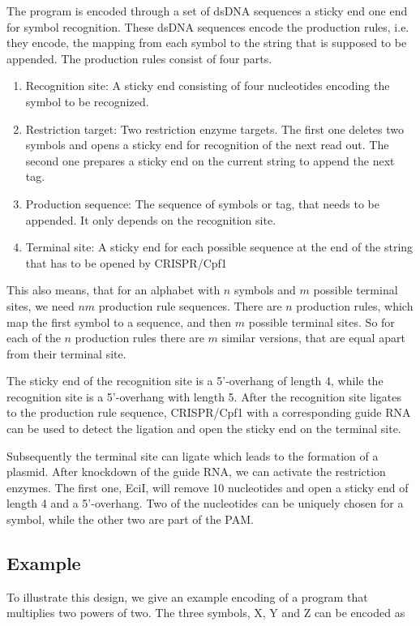 \documentclass[
11pt, %
a4paper, %
oneside, %
headinclude,footinclude, %
BCOR5mm, %
]{scrartcl}
\begin{document}
The program is encoded through a set of dsDNA sequences a sticky end one end for
symbol recognition.
These dsDNA sequences encode the production rules, i.e. they encode, the
mapping from each symbol to the string that is supposed to be appended.
The production rules consist of four parts.

\begin{enumerate}
  \item Recognition site: A sticky end consisting of four nucleotides encoding
    the symbol to be recognized.
  \item Restriction target: Two restriction enzyme targets. The first one
    deletes two symbols and opens a sticky end for recognition of the next
    read out. The second one prepares a sticky end on the current string to
    append the next tag.
  \item Production sequence: The sequence of symbols or tag, that needs to be
    appended. It only depends on the recognition site.
  \item Terminal site: A sticky end for each possible sequence at the end of
    the string that has to be opened by CRISPR/Cpf1
\end{enumerate}

This also means, that for an alphabet with $n$ symbols and $m$ possible terminal
sites, we need $nm$ production rule sequences.
There are $n$ production rules, which map the first symbol to a sequence, and
then $m$ possible terminal sites.
So for each of the $n$ production rules there are $m$ similar versions, that
are equal apart from their terminal site.

The sticky end of the recognition site is a 5'-overhang of length 4, while
the recognition site is a 5'-overhang with length 5.
After the recognition site ligates to the production rule sequence, CRISPR/Cpf1
with a corresponding guide RNA can be used to detect the ligation and open the
sticky end on the terminal site.

Subsequently the terminal site can ligate which leads to the formation of a
plasmid.
After knockdown of the guide RNA, we can activate the restriction enzymes.
The first one, EciI, will remove 10 nucleotides and open a sticky end of length
4 and a 5'-overhang.
Two of the nucleotides can be uniquely chosen for a symbol, while the other two
are part of the PAM.

\subsection{Example}
To illustrate this design, we give an example encoding of a program that
multiplies two powers of two.
The three symbols, X, Y and Z can be encoded as
\end{document}
